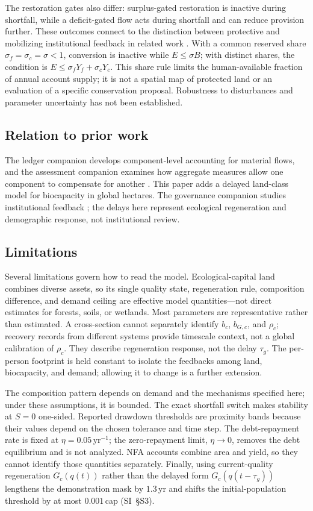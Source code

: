 The restoration gates also differ: surplus-gated restoration is inactive during shortfall, while a deficit-gated flow acts during shortfall and can reduce provision further. These outcomes connect to the distinction between protective and mobilizing institutional feedback in related work \citep{Abaee2026a}. With a common reserved share $\sigma_f=\sigma_c=\sigma<1$, conversion is inactive while $E\le\sigma B$; with distinct shares, the condition is $E\le\sigma_fY_f+\sigma_cY_c$. This share rule limits the human-available fraction of annual account supply; it is not a spatial map of protected land or an evaluation of a specific conservation proposal. Robustness to disturbances and parameter uncertainty has not been established.

\subsection{Relation to prior work}

The ledger companion develops component-level accounting for material flows, and the assessment companion examines how aggregate measures allow one component to compensate for another \citep{Abaee2026b,Abaee2026c}. This paper adds a delayed land-class model for biocapacity in global hectares. The governance companion studies institutional feedback \citep{Abaee2026a}; the delays here represent ecological regeneration and demographic response, not institutional review.

\subsection{Limitations}

Several limitations govern how to read the model. Ecological-capital land combines diverse assets, so its single quality state, regeneration rule, composition difference, and demand ceiling are effective model quantities—not direct estimates for forests, soils, or wetlands. Most parameters are representative rather than estimated. A cross-section cannot separately identify $b_c$, $b_{G,c}$, and $\rho_c$; recovery records from different systems provide timescale context, not a global calibration of $\rho_c$. They describe regeneration response, not the delay $\tau_g$. The per-person footprint is held constant to isolate the feedbacks among land, biocapacity, and demand; allowing it to change is a further extension.

The composition pattern depends on demand and the mechanisms specified here; under these assumptions, it is bounded. The exact shortfall switch makes stability at $S=0$ one-sided. Reported drawdown thresholds are proximity bands because their values depend on the chosen tolerance and time step. The debt-repayment rate is fixed at $\eta=0.05$\,yr$^{-1}$; the zero-repayment limit, $\eta\to0$, removes the debt equilibrium and is not analyzed. NFA accounts combine area and yield, so they cannot identify those quantities separately. Finally, using current-quality regeneration $G_c(q(t))$ rather than the delayed form $G_c(q(t-\tau_g))$ lengthens the demonstration mask by $1.3$\,yr and shifts the initial-population threshold by at most $0.001$\,cap (SI~\S S3).


